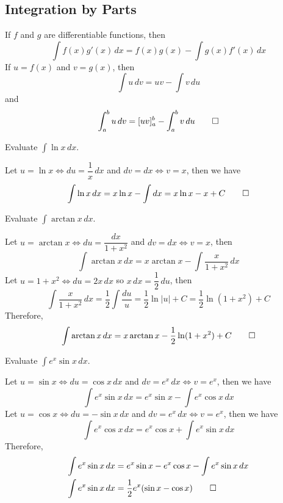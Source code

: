 \subsection{Integration by Parts}
\begin{theorem}
    If \(f\) and \(g\) are differentiable functions, then
    \[\int f(x)g'(x)\,dx=f(x)g(x)-\int g(x)f'(x)\,dx\]
    If \(u=f(x)\) and \(v=g(x)\), then \[\int u\,dv=uv-\int v\,du\] and
    \[\int_a^b u\,dv=[uv]_a^b-\int_a^b v\,du\qedhere\]
\end{theorem}
\begin{problem}
    Evaluate \(\displaystyle{\int\ln x\,dx}\).
\end{problem}
\begin{solution}
    Let \(u=\ln x\iff du=\dfrac{1}{x}\,dx\) and \(dv=dx\iff v=x\),
    then we have \[\int\ln x\,dx=x\ln x-\int dx=x\ln x-x+C\qedhere\]
\end{solution}
\begin{problem}
    Evaluate \(\displaystyle{\int\arctan x\,dx}\).
\end{problem}
\begin{solution}
    Let \(u=\arctan x\iff du=\dfrac{dx}{1+x^2}\) and \(dv=dx\iff v=x\), then
    \[\int\arctan x\,dx=x\arctan x-\int\frac{x}{1+x^2}\,dx\]
    Let \(u=1+x^2\iff du=2x\,dx\) so \(x\,dx=\dfrac{1}{2}\,du\), then
    \[\int\frac{x}{1+x^2}\,dx=\frac{1}{2}\int\frac{du}{u}=\frac{1}{2}\ln|u|+C
    =\frac{1}{2}\ln(1+x^2)+C\]
    Therefore,
    \[\int\arctan x\,dx=x\arctan x-\frac{1}{2}\ln(1+x^2)+C\qedhere\]
\end{solution}
\begin{problem}
    Evaluate \(\displaystyle{\int e^x\sin x\,dx}\).
\end{problem}
\begin{solution}
    Let \(u=\sin x\iff du=\cos x\,dx\) and \(dv=e^x\,dx\iff v=e^x\),
    then we have \[\int e^x\sin x\,dx=e^x\sin x-\int e^x\cos x\,dx\]
    Let \(u=\cos x\iff du=-\sin x\,dx\) and \(dv=e^x\,dx\iff v=e^x\),
    then we have
    \[\int e^x\cos x\,dx=e^x\cos x+\int e^x\sin x\,dx\]
    Therefore,
    \begin{align*}
        \int e^x\sin x\,dx &= e^x\sin x-e^x\cos x-\int e^x\sin x\,dx \\
        \int e^x\sin x\,dx &= \frac{1}{2}e^x(\sin x-\cos x) \qedhere
    \end{align*}
\end{solution}